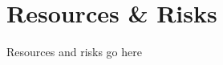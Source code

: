 
\section{Resources \& Risks}
\label{sec:ResourcesAndRisks}

\large{\raggedright
Resources and risks go here\\
}
